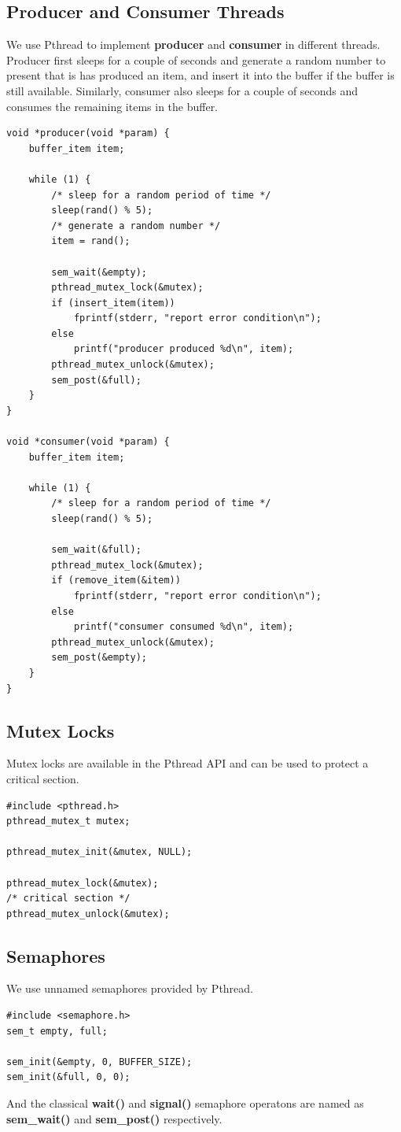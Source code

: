 \documentclass[a4paper, 11pt]{article}
\begin{document}
\subsection{Producer and Consumer Threads}
We use Pthread to implement \textbf{producer} and \textbf{consumer} in different threads. Producer first sleeps for a couple of seconds and generate a random number to present that is has produced an item, and insert it into the buffer if the buffer is still available. Similarly, consumer also sleeps for a couple of seconds and consumes the remaining items in the buffer.
\begin{lstlisting}
void *producer(void *param) {
    buffer_item item;
    
    while (1) {
        /* sleep for a random period of time */
        sleep(rand() % 5);
        /* generate a random number */
        item = rand();
        
        sem_wait(&empty);
        pthread_mutex_lock(&mutex);
        if (insert_item(item))
            fprintf(stderr, "report error condition\n");
        else
            printf("producer produced %d\n", item);
        pthread_mutex_unlock(&mutex);
        sem_post(&full);
    }
}

void *consumer(void *param) {
    buffer_item item;
    
    while (1) {
        /* sleep for a random period of time */
        sleep(rand() % 5);
        
        sem_wait(&full);
        pthread_mutex_lock(&mutex);
        if (remove_item(&item))
            fprintf(stderr, "report error condition\n");
        else
            printf("consumer consumed %d\n", item);
        pthread_mutex_unlock(&mutex);
        sem_post(&empty);
    }
}
\end{lstlisting}
\subsection{Mutex Locks}
Mutex locks are available in the Pthread API and can be used to protect a critical section.
\begin{lstlisting}
#include <pthread.h>
pthread_mutex_t mutex;

pthread_mutex_init(&mutex, NULL);

pthread_mutex_lock(&mutex);
/* critical section */
pthread_mutex_unlock(&mutex);
\end{lstlisting}
\subsection{Semaphores}
We use unnamed semaphores provided by Pthread.
\begin{lstlisting}
#include <semaphore.h>
sem_t empty, full;

sem_init(&empty, 0, BUFFER_SIZE);
sem_init(&full, 0, 0);
\end{lstlisting}
And the classical \textbf{wait()} and \textbf{signal()} semaphore operatons are named as \textbf{sem\_wait()} and \textbf{sem\_post()} respectively.
\end{document}
